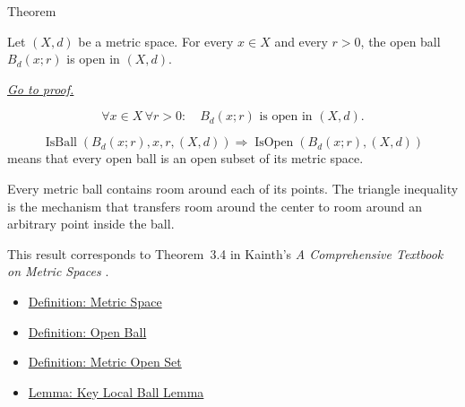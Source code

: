 \begin{theorembox}{Theorem}
\begin{theorem}
\label{thm:metric-open-balls-are-open}
Let \((X,d)\) be a metric space.  For every \(x\in X\) and every \(r>0\),
the open ball \(B_d(x;r)\) is open in \((X,d)\).

\smallskip
\noindent
\hyperref[prf:metric-open-balls-are-open]{\textit{Go to proof.}}
\end{theorem}
\end{theorembox}

\begin{remark*}
\[
\forall x\in X\,\forall r>0{:}\quad
B_d(x;r)\text{ is open in }(X,d).
\]
\end{remark*}

\begin{remark*}
\[
\operatorname{IsBall}(B_d(x;r),x,r,(X,d))
\Longrightarrow
\operatorname{IsOpen}(B_d(x;r),(X,d))
\]
means that every open ball is an open subset of its metric space.
\end{remark*}

\begin{remark*}[Interpretation]
Every metric ball contains room around each of its points.  The triangle
inequality is the mechanism that transfers room around the center to room
around an arbitrary point inside the ball.
\end{remark*}

\begin{remark*}
This result corresponds to Theorem~3.4 in Kainth's
\emph{A Comprehensive Textbook on Metric Spaces}
\cite{KainthComprehensiveMetricSpaces2023}.
\end{remark*}

\begin{dependencies}
\begin{itemize}
  \item \hyperref[def:metric-space]{Definition: Metric Space}
  \item \hyperref[def:metric-open-ball]{Definition: Open Ball}
  \item \hyperref[def:metric-open-set]{Definition: Metric Open Set}
  \item \hyperref[lem:metric-key-local-ball]{Lemma: Key Local Ball Lemma}
\end{itemize}
\end{dependencies}


